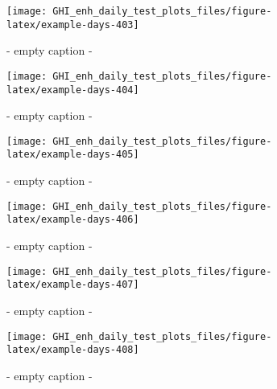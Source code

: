 \documentclass[
  10pt,
  a4paper,oneside]{article}
\begin{document}
\begin{figure}[H]

{\centering \texttt{[image: GHI\_enh\_daily\_test\_plots\_files/figure-latex/example-days-403]} 

}

\caption{ - empty caption - }\label{fig:example-days-403}
\end{figure}

\begin{figure}[H]

{\centering \texttt{[image: GHI\_enh\_daily\_test\_plots\_files/figure-latex/example-days-404]} 

}

\caption{ - empty caption - }\label{fig:example-days-404}
\end{figure}

\begin{figure}[H]

{\centering \texttt{[image: GHI\_enh\_daily\_test\_plots\_files/figure-latex/example-days-405]} 

}

\caption{ - empty caption - }\label{fig:example-days-405}
\end{figure}

\begin{figure}[H]

{\centering \texttt{[image: GHI\_enh\_daily\_test\_plots\_files/figure-latex/example-days-406]} 

}

\caption{ - empty caption - }\label{fig:example-days-406}
\end{figure}

\begin{figure}[H]

{\centering \texttt{[image: GHI\_enh\_daily\_test\_plots\_files/figure-latex/example-days-407]} 

}

\caption{ - empty caption - }\label{fig:example-days-407}
\end{figure}

\begin{figure}[H]

{\centering \texttt{[image: GHI\_enh\_daily\_test\_plots\_files/figure-latex/example-days-408]} 

}

\caption{ - empty caption - }\label{fig:example-days-408}
\end{figure}
\end{document}
